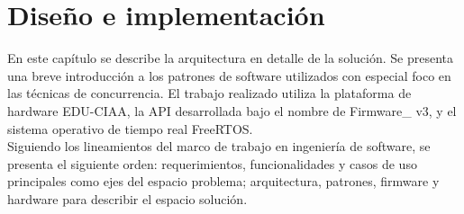 \chapter{Diseño e implementación} %

En este capítulo se describe la arquitectura en detalle de la solución. Se presenta una breve introducción a los patrones de software utilizados con especial foco en las técnicas de concurrencia. El trabajo realizado utiliza la plataforma de hardware EDU-CIAA, la API desarrollada bajo el nombre de Firmware\_ v3, y el sistema operativo de tiempo real FreeRTOS.\\

Siguiendo los lineamientos del marco de trabajo en ingeniería de software, se presenta el siguiente orden: requerimientos, funcionalidades y casos de uso principales como ejes del espacio problema; arquitectura, patrones, firmware y hardware para describir el espacio solución.\\


\label{Chapter3} %


